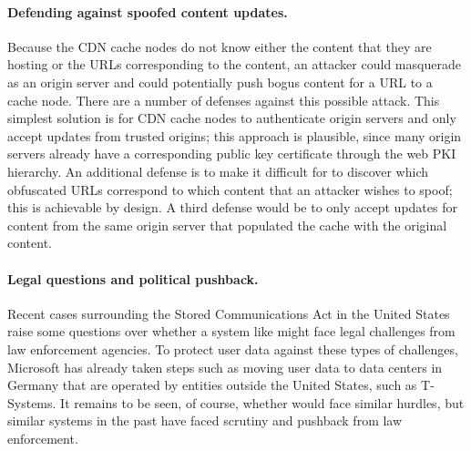 \paragraph{Defending against spoofed content updates.} Because the CDN cache
nodes do not know either the content that they are hosting or the URLs
corresponding to the content, an attacker could masquerade as an origin server
and could potentially push bogus content for a URL to a cache node. There are
a number of defenses against this possible attack. This simplest solution is
for CDN cache nodes to authenticate origin servers and only accept updates
from trusted origins; this approach is plausible, since many origin servers already
have a corresponding public key certificate through the web PKI hierarchy.  An additional
defense is to make it difficult for to discover which obfuscated URLs correspond
to which content that an attacker wishes to spoof; this is achievable by design.
A third defense would be to only accept updates for content from the same origin
server that populated the cache with the original content.

\paragraph{Legal questions and political pushback.} Recent cases surrounding
the Stored Communications Act in the United States raise some questions over
whether a system like \system{} might face legal challenges from law
enforcement agencies. To protect user data against these types of challenges,
Microsoft has already taken steps such as moving user data to data centers in
Germany that are operated by entities outside the United States, such as
T-Systems. It remains to be seen, of course, whether \system{} would face similar
hurdles, but similar systems in the past have faced scrutiny and pushback from law
enforcement.
